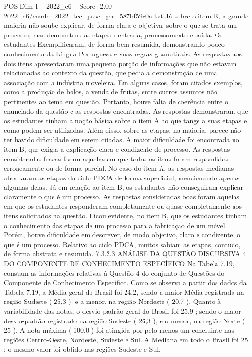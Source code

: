 \begin{textsample}{POS Dim 1 – 2022\_c6 – Score -2.00 – 2022\_c6/enade\_2022\_tec\_proc\_ger\_587bf59e0a.txt}
Já sobre o item B, a grande maioria não soube explicar, de forma clara e objetiva, sobre o que se trata um processo, mas demonstrou as etapas : entrada, processamento e saída.
Os estudantes Exemplificaram, de forma bem resumida, demonstrando pouco conhecimento da Língua Portuguesa e suas regras gramaticais.
As respostas aos dois itens apresentaram uma pequena porção de informações que não estavam relacionadas ao contexto da questão, que pedia a demonstração de uma associação com a indústria moveleira.
Em alguns casos, foram citados exemplos, como a produção de bolos, a venda de frutas, entre outros assuntos não pertinentes ao tema em questão.
Portanto, houve falta de coerência entre o enunciado da questão e as respostas encontradas.
As respostas demonstraram que os estudantes tinham a noção básica sobre o item A no que tange a suas etapas e como podem ser utilizadas.
Além disso, sobre as etapas, na maioria, parece não ter havido dificuldade em serem citadas.
A maior dificuldade foi encontrada no item B, que exigia a explicação clara e condizente de processo.
As respostas consideradas fracas foram aquelas em que todos os itens foram respondidos erroneamente ou de forma parcial.
No caso do item A, as respostas medianas abordaram as etapas do ciclo PDCA de forma superficial, mencionando apenas algumas delas.
Já em relação ao item B, os estudantes não conseguiram explicar claramente o que é um processo.
As respostas consideradas boas foram aquelas em que os estudantes responderam completamente ou quase completamente aos itens solicitados na questão.
Ficou evidente, no item B, que os estudantes tinham o conhecimento das etapas de um processo para a fabricação de um móvel.
Porém, houve dificuldade em descrever, de modo objetivo, claro e condizente, o que é um processo.
Relativo ao ciclo PDCA, muitos sabiam as etapas, contudo, de forma abstrata e resumida. 7.3.2.3 ANÁLISE DA QUESTÃO DISCURSIVA 4 DO COMPONENTE DE CONHECIMENTO ESPECÍFICO Na Tabela 7.19, constam as informações relativas à Questão 4 do conjunto de Questões do Componente de Conhecimento Específico.
Como se observa a partir dos dados da Tabela 7.19, a Média geral do Brasil foi 24,2, sendo a maior Média registrada na região Sudeste ( 25,3 ), e a menor, na região Nordeste ( 20,7 ).
Quanto à variabilidade das notas, o desvio-padrão geral do Brasil foi 25,9 ; sendo o maior desvio-padrão registrado na região Sudeste ( 26,3 ), e o menor, na região Norte ( 25 ).
A nota máxima ( 100,0 ) foi atingida por pelo menos um concluinte nas regiões Centro-Oeste, Nordeste, Sudeste e Sul.
A Mediana em todo o Brasil foi 25 ; o mesmo valor foi obtido nas regiões Sudeste e Sul.

\end{textsample}
